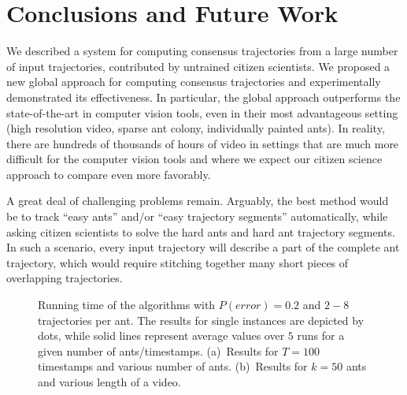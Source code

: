 \documentclass[runningheads]{llncs}
\begin{document}
\section{Conclusions and Future Work}
\label{sect:open}
We described a system for computing consensus trajectories
from a large number of  input trajectories,
contributed by untrained citizen scientists.
We proposed a new global approach for computing consensus
trajectories and
experimentally demonstrated its effectiveness.
In particular, the global approach outperforms the state-of-the-art in
computer vision tools, even in their most advantageous setting (high
resolution video, sparse ant colony, individually painted ants).
In reality, there are hundreds of thousands of hours of video in settings
that are much more difficult for the computer vision tools and where
we expect our citizen science approach to compare even more
favorably.


A great deal of challenging problems remain. Arguably, the best method
would be to track ``easy ants'' and/or ``easy trajectory segments''
automatically, while asking citizen scientists to solve the hard ants
and hard ant trajectory segments. In such a scenario, every input
trajectory will describe a part of the complete ant trajectory, which
would require stitching together many short
pieces of overlapping trajectories.

\begin{figure}[t]
    \center
\hfill
    \caption{Running time of the algorithms with $P(error)=0.2$ and $2-8$ trajectories per ant.
    The results for single instances are depicted by dots, while solid lines represent average values over $5$ runs
    for a given number of ants/timestamps.
    (a)~Results for $T=100$ timestamps and various number of ants.
    (b)~Results for $k=50$ ants and various length of a video.}
    \label{fig:generated-runtime}
\end{figure}
\end{document}
